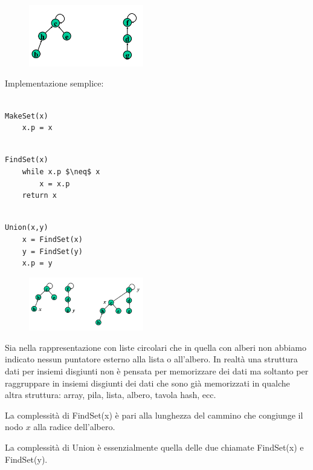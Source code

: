 \begin{figure}[htpd]
\centering
\includegraphics[width=50mm]{images/forest1.png}
\end{figure}

Implementazione semplice:

\begin{lstlisting}

MakeSet(x)
	x.p = x

\end{lstlisting}

\begin{lstlisting}[mathescape=true]

FindSet(x)
	while x.p $\neq$ x
		x = x.p
	return x

\end{lstlisting}

\begin{lstlisting}[mathescape=true]

Union(x,y)
	x = FindSet(x)
	y = FindSet(y)
	x.p = y

\end{lstlisting}

\begin{figure}[htpd]
\centering
\includegraphics[width=50mm]{images/forest2.png}
\end{figure}

Sia nella rappresentazione con liste circolari che in quella con alberi non abbiamo indicato nessun puntatore esterno alla lista o all'albero. In realtà una struttura dati per insiemi disgiunti non è pensata per memorizzare dei dati ma soltanto per raggruppare in insiemi disgiunti dei dati che sono già memorizzati in qualche altra struttura: array, pila, lista, albero, tavola hash, ecc.

La complessità di FindSet(x) è pari alla lunghezza del cammino che congiunge il nodo $x$ alla radice dell'albero.

La complessità di Union è essenzialmente quella delle due chiamate FindSet(x) e FindSet(y).

